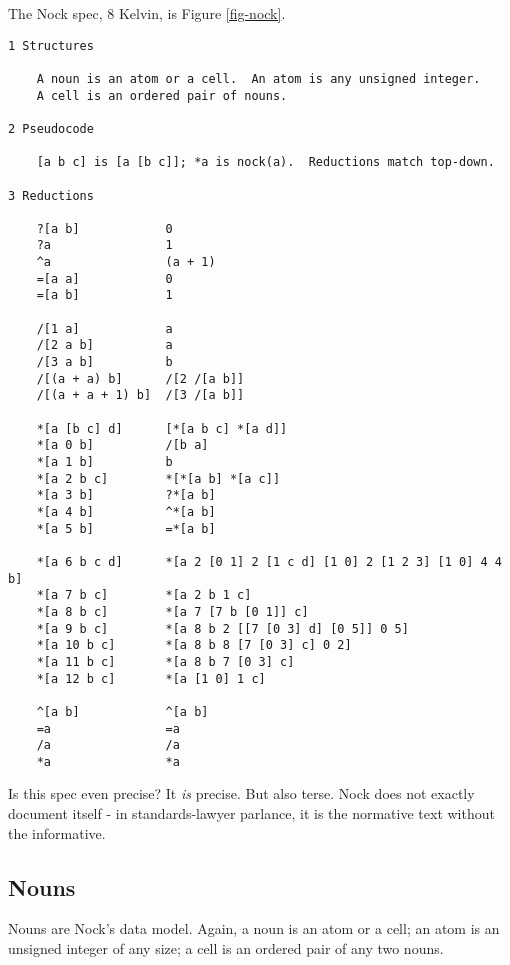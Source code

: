 \documentclass[10pt, nocopyrightspace]{sigplanconf}
\begin{document}
The Nock spec, 8 Kelvin, is Figure \ref{fig-nock}.

\begin{figure*}[ht]
\begin{center}
\makebox[\textwidth]{\hrulefill}
\begin{verbatim}
1 Structures

    A noun is an atom or a cell.  An atom is any unsigned integer.  
    A cell is an ordered pair of nouns.

2 Pseudocode

    [a b c] is [a [b c]]; *a is nock(a).  Reductions match top-down.

3 Reductions

    ?[a b]            0
    ?a                1
    ^a                (a + 1)
    =[a a]            0
    =[a b]            1

    /[1 a]            a
    /[2 a b]          a
    /[3 a b]          b
    /[(a + a) b]      /[2 /[a b]]
    /[(a + a + 1) b]  /[3 /[a b]]

    *[a [b c] d]      [*[a b c] *[a d]]
    *[a 0 b]          /[b a]
    *[a 1 b]          b
    *[a 2 b c]        *[*[a b] *[a c]]
    *[a 3 b]          ?*[a b]
    *[a 4 b]          ^*[a b]
    *[a 5 b]          =*[a b]

    *[a 6 b c d]      *[a 2 [0 1] 2 [1 c d] [1 0] 2 [1 2 3] [1 0] 4 4 b]
    *[a 7 b c]        *[a 2 b 1 c]
    *[a 8 b c]        *[a 7 [7 b [0 1]] c]
    *[a 9 b c]        *[a 8 b 2 [[7 [0 3] d] [0 5]] 0 5]
    *[a 10 b c]       *[a 8 b 8 [7 [0 3] c] 0 2]
    *[a 11 b c]       *[a 8 b 7 [0 3] c]
    *[a 12 b c]       *[a [1 0] 1 c]

    ^[a b]            ^[a b]
    =a                =a
    /a                /a
    *a                *a
\end{verbatim}
\end{center}
\caption{Nock 8K}
\label{fig-nock}
\end{figure*}

Is this spec even precise?  It \emph{is} precise.  But also terse.  Nock does
not exactly document itself - in standards-lawyer parlance, it is
the normative text without the informative. 

\subsection{Nouns}

Nouns are Nock's data model.  Again, a noun is an atom or a cell;
an atom is an unsigned integer of any size; a cell is an ordered
pair of any two nouns.
\end{document}
